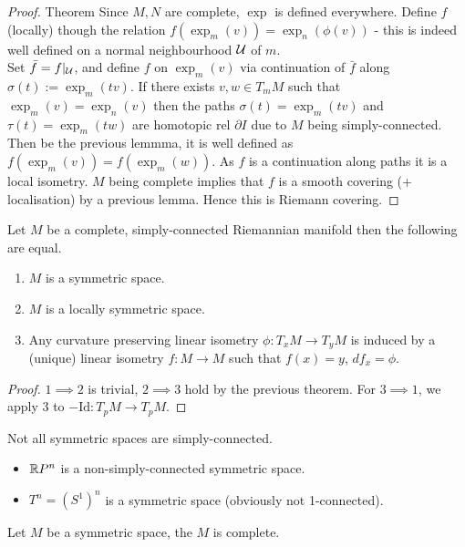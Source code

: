 \documentclass[10pt,a4paper]{article}
\begin{document}
\begin{proof}{Theorem}
Since $M,N$ are complete, $\exp$ is defined everywhere. Define $f$ (locally) though the relation $f(\exp_m(v))=\exp_n(\phi(v))$ - this is indeed well defined on a normal neighbourhood $\mathcal{U}$ of $m$.\\
Set $\bar{f} = f\vert_{\mathcal{U}}$, and define $f$ on $\exp_m(v)$ via continuation of $\bar{f}$ along $\sigma(t) := \exp_m(tv)$. If there exists $v,w\in T_mM$ such that $\exp_m(v) = \exp	_n(v)$ then the paths $\sigma(t) = \exp_m(tv)$ and $\tau(t) = \exp_m(tw)$ are homotopic rel $\partial I$ due to $M$ being simply-connected. Then be the previous lemmma, it is well defined as $f(\exp_m(v)) = f(\exp_m(w))$. As $f$ is a continuation along paths it is a local isometry. $M$ being complete implies that $f$ is a smooth covering (+ localisation) by a previous lemma. Hence this is Riemann covering.
\end{proof}

\begin{theorem}
Let $M$ be a complete, simply-connected Riemannian manifold then the following are equal.
\begin{enumerate}
\item $M$ is a symmetric space.
\item $M$ is a locally symmetric space.
\item Any curvature preserving linear isometry $\phi:T_xM\to T_yM$ is induced by a (unique) linear isometry $f:M\to M$ such that $f(x)=y$, $df_x = \phi$.
\end{enumerate}
\end{theorem}
\begin{proof}
$1\implies 2$ is trivial, $2\implies 3$ hold by the previous theorem. For $3\implies 1$, we apply $3$ to $-\text{Id}:T_pM\to T_pM$.
\end{proof}

\begin{remark}
Not all symmetric spaces are simply-connected.
\end{remark}
\begin{example}
\begin{itemize}
\item $\mathbb{R} P^n$ is a non-simply-connected symmetric space.
\item $T^n  = (S^1)^n$ is a symmetric space (obviously not 1-connected).
\end{itemize}
\end{example}
\begin{prop}
Let $M$ be a symmetric space, the $M$ is complete.
\end{prop}
\end{document}

